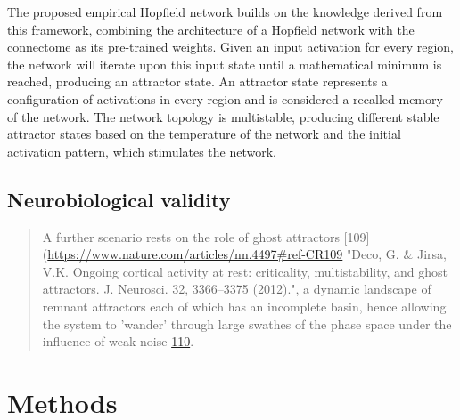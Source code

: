 \documentclass{article}
\begin{document}
The proposed empirical Hopfield network builds on the knowledge derived from this framework, combining the architecture of a Hopfield network with the connectome as its pre-trained weights. Given an input activation for every region, the network will iterate upon this input state until a mathematical minimum is reached, producing an attractor state. An attractor state represents a configuration of activations in every region and is considered a recalled memory of the network. The network topology is multistable, producing different stable attractor states based on the temperature of the network and the initial activation pattern, which stimulates the network.

\subsection{Neurobiological validity}\label{Neurobiological validity}

\begin{quote}
A further scenario rests on the role of ghost attractors [109](\href{https://www.nature.com/articles/nn.4497\#ref-CR109}{https://www.nature.com/articles/nn.4497\#ref-CR109} "Deco, G. \& Jirsa, V.K. Ongoing cortical activity at rest: criticality, multistability, and ghost attractors. J. Neurosci. 32, 3366--3375 (2012).", a dynamic landscape of remnant attractors each of which has an incomplete basin, hence allowing the system to 'wander' through large swathes of the phase space under the influence of weak noise \href{https://www.nature.com/articles/nn.4497\#ref-CR110}{110}.
\end{quote}

\section{Methods}\label{Methods}
\end{document}
